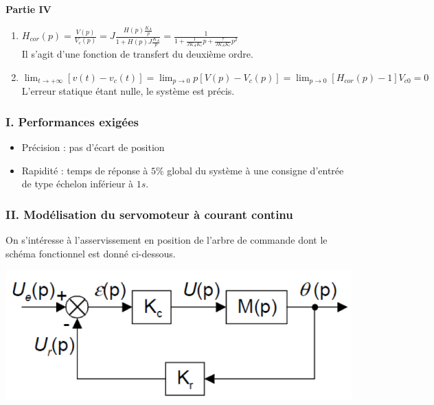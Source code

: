 {\textbf{Partie IV}
\begin{enumerate}
\item \( H_{cor}(p)=\frac{V(p)}{V_c(p)}=J\frac{H(p)\frac{K_A}{p}}{1+H(p)J\frac{K_A}{p}}=\frac{1}{1+\frac{1}{JK_AK_c}p+\frac{\tau}{JK_AK_c}p^2} \)\\
Il s'agit d'une fonction de transfert du deuxième ordre.
\item \( \lim_{t \to +\infty}[v(t)-v_c(t)]=\lim_{p \to 0}p[V(p)-V_c(p)]=\lim_{p \to 0}[H_{cor}(p)-1]V_{c0}=0 \)\\
L'erreur statique étant nulle, le système est précis.
\end{enumerate}
}
\newpage



\subsubsection{I. Performances exig\'ees}
\begin{itemize}
\item Pr\'ecision : pas d'\'ecart de position
\item Rapidit\'e : temps de r\'eponse \`a $5\%$ global du syst\`eme \`a une consigne d'entr\'ee de type \'echelon inf\'erieur \`a $1s$.
\end{itemize}

\subsubsection{II. Mod\'elisation du servomoteur \`a courant continu}
On s'int\'eresse \`a l'asservissement en position de l'arbre de commande dont le sch\'ema fonctionnel est donn\'e ci-dessous.\\

\begin{center}
\includegraphics[scale=0.4]{png/image2_prob4.png}
\end{center}


